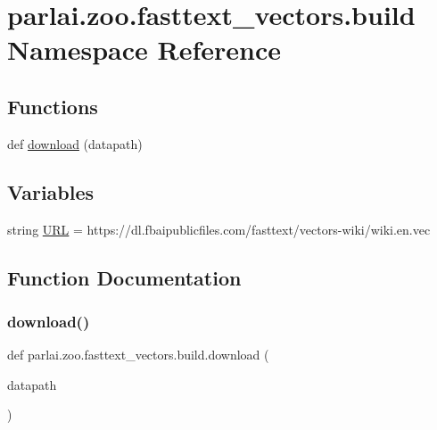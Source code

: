 \hypertarget{namespaceparlai_1_1zoo_1_1fasttext__vectors_1_1build}{}\section{parlai.\+zoo.\+fasttext\+\_\+vectors.\+build Namespace Reference}
\label{namespaceparlai_1_1zoo_1_1fasttext__vectors_1_1build}
\subsection*{Functions}
\begin{DoxyCompactItemize}
\item 
def \hyperlink{namespaceparlai_1_1zoo_1_1fasttext__vectors_1_1build_a7aab81733d26caeb7ab607173b53932b}{download} (datapath)
\end{DoxyCompactItemize}
\subsection*{Variables}
\begin{DoxyCompactItemize}
\item 
string \hyperlink{namespaceparlai_1_1zoo_1_1fasttext__vectors_1_1build_a1400fb8120aae9b826dbdf00b35be0ac}{U\+RL} = \textquotesingle{}https\+://dl.\+fbaipublicfiles.\+com/fasttext/vectors-\/wiki/wiki.\+en.\+vec\textquotesingle{}
\end{DoxyCompactItemize}


\subsection{Function Documentation}
\mbox{\label{namespaceparlai_1_1zoo_1_1fasttext__vectors_1_1build_a7aab81733d26caeb7ab607173b53932b}} 
\subsubsection{\texorpdfstring{download()}{download()}}
{\footnotesize\ttfamily def parlai.\+zoo.\+fasttext\+\_\+vectors.\+build.\+download (\begin{DoxyParamCaption}\item[{}]{datapath }\end{DoxyParamCaption})}



